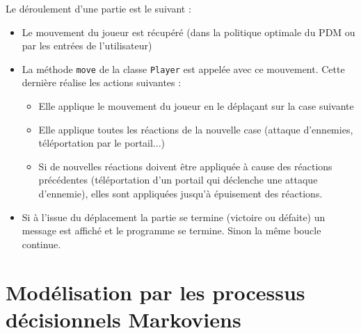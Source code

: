 \documentclass[a4paper]{article}
\theoremstyle{plain}
\begin{document}
Le déroulement d'une partie est le suivant :
\begin{itemize}
	\item Le mouvement du joueur est récupéré (dans la politique optimale du PDM ou par les entrées de l'utilisateur)
	\item La méthode \texttt{move} de la classe \texttt{Player} est appelée avec ce mouvement. Cette dernière réalise les actions suivantes :
	\begin{itemize}
		\item Elle applique le mouvement du joueur en le déplaçant sur la case suivante
		\item Elle applique toutes les réactions de la nouvelle case (attaque d'ennemies, téléportation par le portail...)
		\item Si de nouvelles réactions doivent être appliquée à cause des réactions précédentes (téléportation d'un portail qui déclenche une attaque d'ennemie), elles sont appliquées jusqu'à épuisement des réactions.
	\end{itemize}
	\item Si à l'issue du déplacement la partie se termine (victoire ou défaite) un message est affiché et le programme se termine. Sinon la même boucle continue.
\end{itemize}

\section{Modélisation par les processus décisionnels Markoviens}
\end{document}
